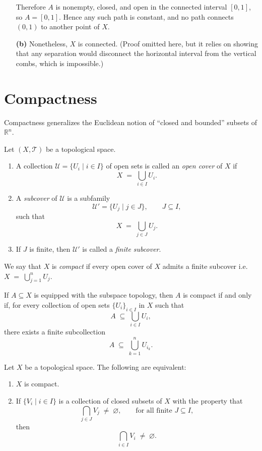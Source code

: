 \begin{example}
\begin{enumerate}
Therefore \(A\) is nonempty, closed, and open in the connected interval \([0,1]\), so \(A = [0,1]\).  
Hence any such path is constant, and no path connects \((0,1)\) to another point of \(X\).

\item[\textbf{(b)}] 
Nonetheless, \(X\) is connected. (Proof omitted here, but it relies on showing that any separation would disconnect the horizontal interval from the vertical combs, which is impossible.)
\end{enumerate}
\end{example}

\section{Compactness}

Compactness generalizes the Euclidean notion of “closed and bounded” subsets of \(\mathbb{R}^n\).

\begin{definition}[Compactness]
\label{def:compactness}
Let \((X, \mathcal{T})\) be a topological space.  

\begin{enumerate}
\item 
A collection \(\mathcal{U} = \{U_i \mid i \in I\}\) of open sets is called an \emph{open cover} of \(X\) if
\[
X \;=\; \bigcup_{i \in I} U_i.
\]

\item 
A \emph{subcover} of \(\mathcal{U}\) is a subfamily
\[
\mathcal{U}' = \{ U_j \mid j \in J \}, \qquad J \subseteq I,
\]
such that
\[
X \;=\; \bigcup_{j \in J} U_j.
\]

\item 
If \(J\) is finite, then \(\mathcal{U}'\) is called a \emph{finite subcover}.
\end{enumerate}

We say that \(X\) is \emph{compact} if every open cover of \(X\) admits a finite subcover i.e. \(X \;=\; \bigcup\limits_{j = 1}^n U_j.\)

\medskip
If \(A \subseteq X\) is equipped with the subspace topology, then \(A\) is compact if and only if,
for every collection of open sets \(\{U_i\}_{i \in I}\) in \(X\) such that
\[
A \;\subseteq\; \bigcup_{i \in I} U_i,
\]
there exists a finite subcollection
\[
A \;\subseteq\; \bigcup_{k=1}^n U_{i_k}.
\]
\end{definition}

\begin{proposition}
\label{prop:FIP}
Let \(X\) be a topological space. The following are equivalent:
\begin{enumerate}
\item \(X\) is compact.
\item If \(\{V_i \mid i \in I\}\) is a collection of closed subsets of \(X\) with the property that
\[
\bigcap_{j \in J} V_j \;\neq\; \varnothing, 
\qquad \text{for all finite } J \subseteq I,
\]
then
\[
\bigcap_{i \in I} V_i \;\neq\; \varnothing.
\]
\end{enumerate}
\end{proposition}


